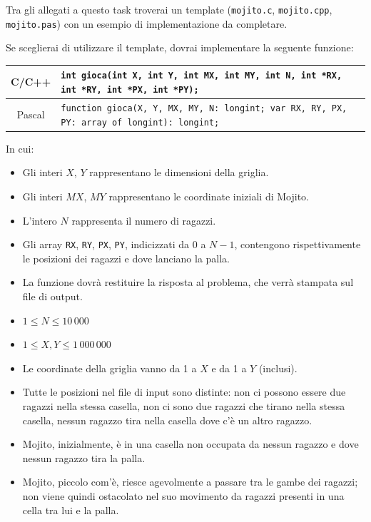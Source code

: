 \begin{warning}
Tra gli allegati a questo task troverai un template (\texttt{mojito.c}, \texttt{mojito.cpp}, \texttt{mojito.pas}) con un esempio di implementazione da completare.
\end{warning}

Se sceglierai di utilizzare il template, dovrai implementare la seguente funzione:
\begin{center}\begin{tabularx}{\textwidth}{|c|X|}
\hline
C/C++  & \small{\verb|int gioca(int X, int Y, int MX, int MY, int N, int *RX, int *RY, int *PX, int *PY);|}\\
\hline
Pascal & \footnotesize{\verb|function gioca(X, Y, MX, MY, N: longint; var RX, RY, PX, PY: array of longint): longint;|}\\
\hline
\end{tabularx}\end{center}
In cui:
\begin{itemize}[nolistsep]
  \item Gli interi $X$, $Y$ rappresentano le dimensioni della griglia.
  \item Gli interi $MX$, $MY$ rappresentano le coordinate iniziali di Mojito.
  \item L'intero $N$ rappresenta il numero di ragazzi.
  \item Gli array \texttt{RX}, \texttt{RY}, \texttt{PX}, \texttt{PY}, indicizzati da $0$ a $N-1$, contengono rispettivamente le posizioni dei ragazzi e dove lanciano la palla.
  \item La funzione dovrà restituire la risposta al problema, che verrà stampata sul file di output.
\end{itemize}

\Constraints
\begin{itemize}[nolistsep, itemsep=2mm]
\item $1 \le N \le 10\,000$
\item $1 \le X,Y \le 1\,000\,000$
\item Le coordinate della griglia vanno da 1 a $X$ e da 1 a $Y$ (inclusi).
\item Tutte le posizioni nel file di input sono distinte: non ci possono essere due ragazzi nella stessa casella, non ci sono due ragazzi che tirano nella stessa casella, nessun ragazzo tira nella casella dove c’è un altro ragazzo.
\item Mojito, inizialmente, è in una casella non occupata da nessun ragazzo e dove nessun ragazzo tira la palla.
\item Mojito, piccolo com’è, riesce agevolmente a passare tra le gambe dei ragazzi; non viene quindi ostacolato nel suo movimento da ragazzi presenti in una cella tra lui e la palla.
\end{itemize}

